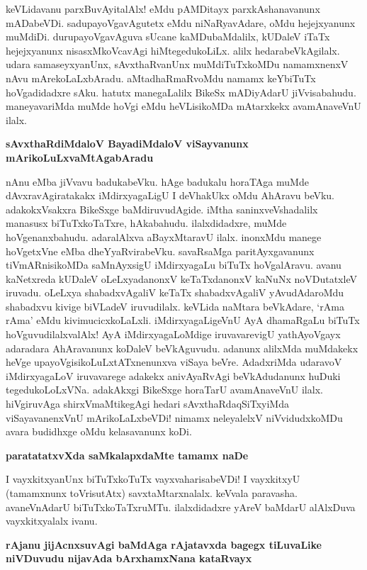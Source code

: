 \noindent
keVLidavanu parxBuvAyitalAlx! eMdu pAMDitayx parxkAshanavanunx mADabeVDi. sadupayoVgavAgutetx eMdu niNaRyavAdare, oMdu hejejxyanunx muMdiDi. durupayoVgavAguva sUcane kaMDubaMdalilx, kUDaleV iTaTx hejejxyanunx nisasxMkoVcavAgi hiMtegedukoLiLx. alilx hedarabeVkAgilalx. udara samaseyxyanUnx, sAvxthaRvanUnx muMdiTuTxkoMDu namamxnenxV nAvu mArekoLaLxbAradu. aMtadhaRmaRvoMdu namamx keYbiTuTx hoVgadidadxre sAku. hatutx manegaLalilx BikeSx mADiyAdarU jiVvisabahudu. maneyavariMda muMde hoVgi eMdu heVLisikoMDa mAtarxkekx avamAnaveVnU ilalx.

{\bigskip
\noindent
{\large\bf sAvxthaRdiMdaloV BayadiMdaloV viSayvanunx mArikoLuLxvaMtAgabAradu}}\label{page252a}
\medskip

\noindent
nAnu eMba jiVvavu badukabeVku. hAge badukalu horaTAga muMde dAvxravAgiratakakx iMdirxyagaLigU I deVhakUkx oMdu AhAravu beVku. adakokxVsakxra BikeSxge baMdiruvudAgide. iMtha saninxveVshadalilx manasusx biTuTxkoTaTxre, hAkabahudu. ilalxdidadxre, muMde hoVgenanxbahudu. adaralAlxva aBayxMtaravU ilalx. inonxMdu manege hoVgetxVne eMba dheYyaRvirabeVku. savaRsaMga paritAyxgavanunx tiVmARnisikoMDa saMnAyxsigU iMdirxyagaLu biTuTx hoVgalAravu. avanu kaNetxreda kUDaleV oLeLxyadanonxV keTaTxdanonxV kaNuNx noVDutatxleV iruvadu. oLeLxya shabadxvAgaliV keTaTx shabadxvAgaliV yAvudAdaroMdu shabadxvu kivige biVLadeV iruvudilalx. keVLida naMtara beVkAdare, `rAma rAma' eMdu kivimucicxkoLaLxli. iMdirxyagaLigeVnU AyA dhamaRgaLu biTuTx hoVguvudilalxvalAlx! AyA iMdirxyagaLoMdige iruvavarevigU yathAyoVgayx adaradara AhAravanunx koDaleV beVkAguvudu. adanunx alilxMda muMdakekx heVge upayoVgisikoLuLxtATxnenunxva viSaya beVre. AdadxriMda udaravoV iMdirxyagaLoV iruvavarege adakekx anivAyaRvAgi beVkAdudanunx huDuki tegedukoLoLxVNa. adakAkxgi BikeSxge horaTarU avamAnaveVnU ilalx. hiVgiruvAga shirxVmaMtikegAgi hedari sAvxthaRdaqSiTxyiMda viSayavanenxVnU mArikoLaLxbeVDi! nimamx neleyalelxV niVvidudxkoMDu avara budidhxge oMdu kelasavanunx koDi.

{\bigskip
\noindent
{\large\bf paratatatxvXda saMkalapxdaMte tamamx naDe}}\label{page253}
\medskip

\noindent
I vayxkitxyanUnx biTuTxkoTuTx vayxvaharisabeVDi! I vayxkitxyU (tamamxnunx toVrisutAtx) savxtaMtarxnalalx. keVvala paravasha. avaneVnAdarU biTuTxkoTaTxruMTu. ilalxdidadxre yAreV baMdarU alAlxDuva vayxkitxyalalx ivanu.

{\bigskip
\noindent
{\large\bf rAjanu jijAcnxsuvAgi baMdAga rAjatavxda bagegx tiLuvaLike niVDuvudu nijavAda bArxhamxNana kataRvayx}}\label{page253b}
\medskip

